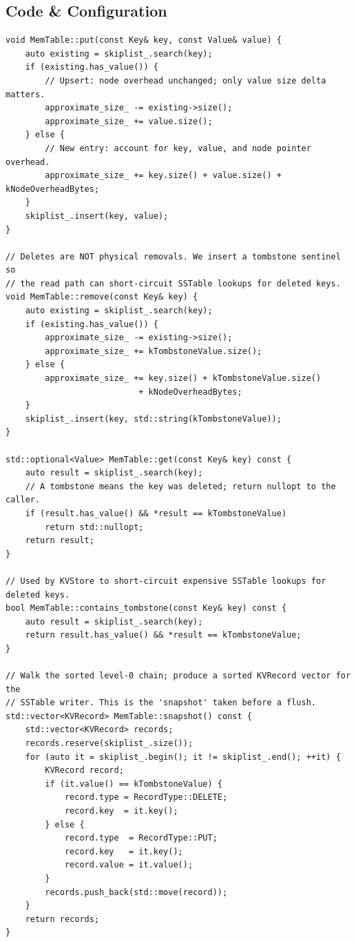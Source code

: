\documentclass[11pt,a4paper]{article}
\begin{document}
\subsection{Code \& Configuration}

\begin{lstlisting}[style=cpp, caption={MemTable Core Logic: \texttt{src/memtable.cpp}}]
void MemTable::put(const Key& key, const Value& value) {
    auto existing = skiplist_.search(key);
    if (existing.has_value()) {
        // Upsert: node overhead unchanged; only value size delta matters.
        approximate_size_ -= existing->size();
        approximate_size_ += value.size();
    } else {
        // New entry: account for key, value, and node pointer overhead.
        approximate_size_ += key.size() + value.size() + kNodeOverheadBytes;
    }
    skiplist_.insert(key, value);
}

// Deletes are NOT physical removals. We insert a tombstone sentinel so
// the read path can short-circuit SSTable lookups for deleted keys.
void MemTable::remove(const Key& key) {
    auto existing = skiplist_.search(key);
    if (existing.has_value()) {
        approximate_size_ -= existing->size();
        approximate_size_ += kTombstoneValue.size();
    } else {
        approximate_size_ += key.size() + kTombstoneValue.size()
                           + kNodeOverheadBytes;
    }
    skiplist_.insert(key, std::string(kTombstoneValue));
}

std::optional<Value> MemTable::get(const Key& key) const {
    auto result = skiplist_.search(key);
    // A tombstone means the key was deleted; return nullopt to the caller.
    if (result.has_value() && *result == kTombstoneValue)
        return std::nullopt;
    return result;
}

// Used by KVStore to short-circuit expensive SSTable lookups for deleted keys.
bool MemTable::contains_tombstone(const Key& key) const {
    auto result = skiplist_.search(key);
    return result.has_value() && *result == kTombstoneValue;
}

// Walk the sorted level-0 chain; produce a sorted KVRecord vector for the
// SSTable writer. This is the 'snapshot' taken before a flush.
std::vector<KVRecord> MemTable::snapshot() const {
    std::vector<KVRecord> records;
    records.reserve(skiplist_.size());
    for (auto it = skiplist_.begin(); it != skiplist_.end(); ++it) {
        KVRecord record;
        if (it.value() == kTombstoneValue) {
            record.type = RecordType::DELETE;
            record.key  = it.key();
        } else {
            record.type  = RecordType::PUT;
            record.key   = it.key();
            record.value = it.value();
        }
        records.push_back(std::move(record));
    }
    return records;
}
\end{lstlisting}
\end{document}
